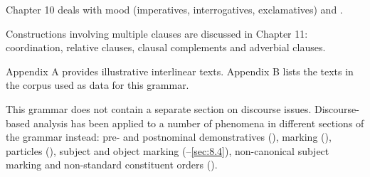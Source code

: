 Chapter 10 deals with mood (imperatives, interrogatives, exclamatives) and . 

Constructions involving multiple clauses are discussed in Chapter 11: coordination, relative clauses, clausal complements and adverbial clauses.

Appendix A provides illustrative interlinear texts. Appendix B lists the texts in the corpus used as data for this grammar.

This grammar does not contain a separate section on discourse issues. 
Discourse-based analysis has been applied to a number of phenomena in different sections of the grammar instead: pre- and postnominal demonstratives (),  marking (),  particles (), subject and object marking (–\ref{sec:8.4}), non-canonical subject marking and non-standard constituent orders ().
